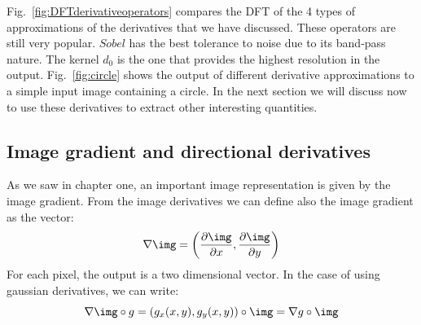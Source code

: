 Fig.~\ref{fig:DFTderivativeoperators} compares the DFT of the 4 types of approximations of the derivatives that we have discussed. These operators are still very popular. $Sobel$ has the best tolerance to noise due to its band-pass nature. The kernel $d_0$ is the one that provides the highest resolution in the output. Fig.~\ref{fig:circle} shows the output of different derivative approximations to a simple input image containing a circle. In the next section we will discuss now to use these derivatives to extract other interesting quantities.


\subsection{Image gradient and directional derivatives}

As we saw in chapter one, an important image representation is given by the image gradient. From the image derivatives we can define also the image gradient as the vector:
\begin{equation}
\nabla \img = \left( \frac{\partial \img}{\partial x}, \frac{\partial \img}{\partial y} \right)
\end{equation}
For each pixel, the output is a two dimensional vector.  In the case of using gaussian derivatives, we can write:
\begin{equation}
\nabla \img \circ g = \left( g_x(x,y), g_y(x,y) \right) \circ \img = \nabla g \circ \img
\end{equation}

